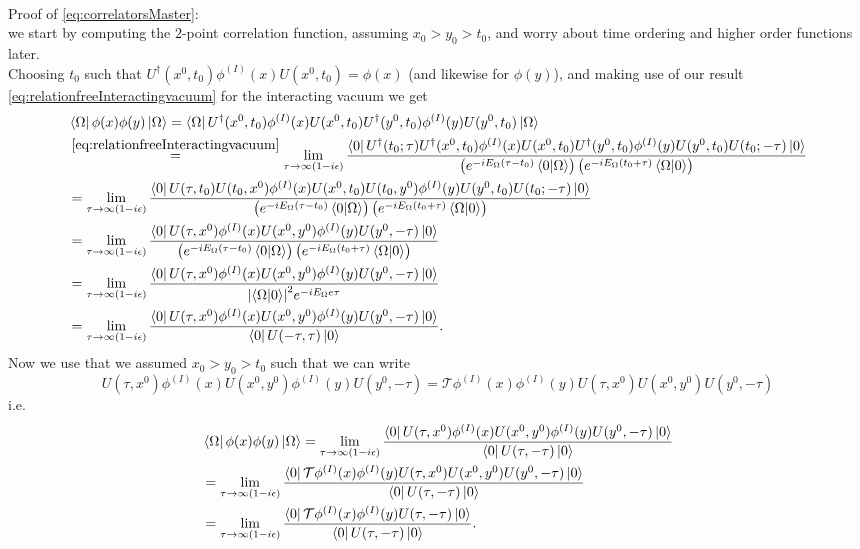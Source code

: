 \\
Proof of \ref{eq:correlatorsMaster}:\\
we start by computing the $2$-point correlation function, assuming $x_0>y_0>t_0$, and worry about time ordering and higher order functions later.\\
Choosing $t_0$ such that $U^\dagger (x^0,t_0)\phi^{(I)}(x) U(x^0,t_0)= \phi(x)$ (and likewise for $\phi(y)$), and making use of our result \ref{eq:relationfreeInteractingvacuum} for the interacting vacuum we get
\begin{align*}
	& \bra{\Omega}\phi(x) \phi(y) \ket{\Omega} = \bra{\Omega}U^\dagger(x^0,t_0) \phi^{(I)}(x) U(x^0,t_0) U^\dagger(y^0,t_0) \phi^{(I)}(y) U(y^0,t_0)\ket{\Omega}\\
	&\stackrel{\ref{eq:relationfreeInteractingvacuum}}{=} \lim_{\tau\rightarrow \infty(1-i \epsilon)}
	\frac{\bra{0}U^\dagger(t_0;\tau) U^\dagger(x^0,t_0) \phi^{(I)}(x) U(x^0,t_0) U^\dagger(y^0,t_0) \phi^{(I)}(y) U(y^0,t_0) U(t_0;-\tau) \ket{0}}{\left(e^{-iE_\Omega (\tau-t_0)} \braket{0}{\Omega} \right) \left(e^{-i E_\Omega(t_0+\tau)} \braket{\Omega}{0} \right)} \\
	&= \lim_{\tau\rightarrow \infty(1-i \epsilon)}\frac{\bra{0} U(\tau,t_0) U(t_0,x^0) \phi^{(I)}(x) U(x^0,t_0) U(t_0,y^0) \phi^{(I)} (y) U(y^0,t_0) U(t_0;-\tau) \ket{0}}{\left(e^{-i E_\Omega (\tau-t_0)} \braket{0}{\Omega}\right)\left(e^{-iE_\Omega(t_0+\tau)} \braket{\Omega}{0}\right)} \\
	&= \lim_{\tau\rightarrow \infty(1-i \epsilon)}\frac{\bra{0} U(\tau,x^0) \phi^{(I)} (x) U(x^0,y^0) \phi^{(I)} (y) U(y^0,-\tau) \ket{0}}{\left(e^{-i E_\Omega (\tau-t_0)} \braket{0}{\Omega}\right) \left(e^{-i E_\Omega(t_0+\tau) } \braket{\Omega}{0}\right)}\\
	&= \lim_{\tau\rightarrow \infty(1-i \epsilon)}\frac{\bra{0}U(\tau,x^0) \phi^{(I)}(x) U(x^0,y^0) \phi^{(I)}(y) U(y^0,-\tau) \ket{0}}{\abs{\braket{\Omega}{0}}^2 e^{-iE_\Omega e\tau} }\\
	&=\lim_{\tau\rightarrow \infty(1-i \epsilon)} \frac{\bra{0}U(\tau,x^0) \phi^{(I)}(x) U(x^0,y^0) \phi^{(I)}(y) U(y^0,-\tau)\ket{0}}{\bra{0}U(-\tau,\tau) \ket{0}}.
\end{align*}
Now we use that we assumed $x_0>y_0>t_0$ such that we can write
\begin{equation*}
	U(\tau,x^0) \phi^{(I)}(x) U(x^0,y^0) \phi^{(I)}(y) U(y^0,-\tau) = \mathcal{T}\phi^{(I)}(x) \phi^{(I)} (y) U(\tau,x^0) U(x^0,y^0) U(y^0,-\tau)
\end{equation*}
i.e.
\begin{align*}
	& \bra{\Omega}\phi(x)\phi(y)\ket{\Omega} = \lim_{\tau\rightarrow \infty(1-i \epsilon)}\frac{\bra{0}U(\tau,x^0) \phi^{(I)}(x) U(x^0,y^0) \phi^{(I)}(y) U(y^0,-\tau) \ket{0}}{\bra{0}U(\tau,-\tau)\ket{0}}\\
	&= \lim_{\tau\rightarrow \infty(1-i \epsilon)} \frac{\bra{0}\mathcal{T}\phi^{(I)}(x) \phi^{(I)}(y) U(\tau,x^0) U(x^0,y^0) U(y^0,-\tau) \ket{0}}{\bra{0}U(\tau,-\tau)\ket{0}}\\
	&= \lim_{\tau\rightarrow \infty(1-i \epsilon)} \frac{\bra{0}\mathcal{T}\phi^{(I)}(x) \phi^{(I)}(y) U(\tau,-\tau) \ket{0}}{\bra{0}U(\tau,-\tau)\ket{0}}.
\end{align*}

